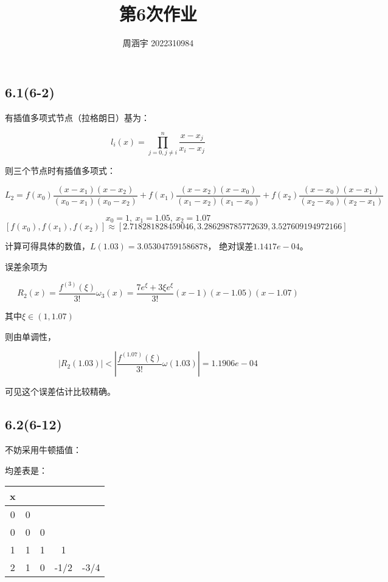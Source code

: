 \documentclass[UTF8,zihao=5]{ctexart}
\title{{\bfseries 第6次作业}}
\author{周涵宇 2022310984}
\date{}
\begin{document}
\maketitle

\subsection*{6.1(6-2)}

有插值多项式节点（拉格朗日）基为：

$$
    l_i(x) = \prod_{j=0,j\neq i}^n{\frac{
        x-x_j
    }{
        x_i-x_j
    }}
$$

则三个节点时有插值多项式：

$$
    L_2=
    f(x_0)\frac{(x-x_1)(x-x_2)}{(x_0-x_1)(x_0-x_2)}+
    f(x_1)\frac{(x-x_2)(x-x_0)}{(x_1-x_2)(x_1-x_0)}+
    f(x_2)\frac{(x-x_0)(x-x_1)}{(x_2-x_0)(x_2-x_1)}
$$

$$
    x_0=1,~x_1=1.05,~x_2=1.07
$$
$$
    [f(x_0),f(x_1),f(x_2)]\approx[2.718281828459046,3.286298785772639,3.527609194972166]
$$

计算可得具体的数值，$L(1.03)=3.053047591586878$，
绝对误差$1.1417e-04$。

误差余项为

$$
    R_2(x)=\frac{f^{(3)}(\xi)}{3!}\omega_3(x)
    =\frac{7e^{\xi}+3\xi e^{\xi}}{3!}(x-1)(x-1.05)(x-1.07)
$$

其中$\xi\in(1,1.07)$

则由单调性，

$$
    |R_2(1.03)|<|\frac{f^{(1.07)}(\xi)}{3!}\omega(1.03)|
    = 1.1906e-04
$$

可见这个误差估计比较精确。

\subsection*{6.2(6-12)}
不妨采用牛顿插值：

均差表是：
\begin{table}[H]
    \centering
    \begin{tabular}{c|cccc}
        x                       \\
        \hline
        0 & 0 &   &      &      \\
        0 & 0 & 0 &      &      \\
        1 & 1 & 1 & 1    &      \\
        2 & 1 & 0 & -1/2 & -3/4 \\
    \end{tabular}
\end{table}
\end{document}
